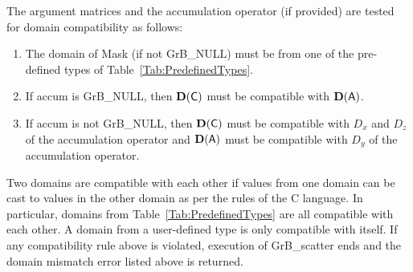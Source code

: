The argument matrices and the accumulation 
operator (if provided) are tested for domain compatibility as follows:
\begin{enumerate}
	\item The domain of {\sf Mask} (if not {\sf GrB\_NULL}) must be from one of 
    the pre-defined types of Table~\ref{Tab:PredefinedTypes}.

	\item If {\sf accum} is {\sf GrB\_NULL}, then $\bold{D}({\sf C})$ must be 
    compatible with $\bold{D}({\sf A})$.

	\item If {\sf accum} is not {\sf GrB\_NULL}, then $\bold{D}({\sf C})$ must be
    compatible with $D_x$ and $D_z$ of the accumulation operator and 
    $\bold{D}({\sf A})$ must be compatible with $D_y$ of the accumulation operator.
\end{enumerate}
Two domains are compatible with each other if values from one domain can be cast 
to values in the other domain as per the rules of the C language.
In particular, domains from Table~\ref{Tab:PredefinedTypes} are all compatible 
with each other. A domain from a user-defined type is only compatible with itself.
If any compatibility rule above is violated, execution of {\sf GrB\_scatter} ends
and the domain mismatch error listed above is returned.

